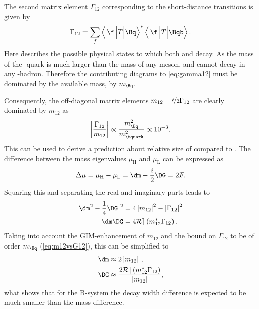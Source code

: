 The second matrix element $\Gamma_{12}$ corresponding to the short-distance transitions is given by
\begin{equation}
\Gamma_{12}=\sum_f\left<\,\f\,\Big|T\Big|\Bq\right>^\ast\left<\,\f\,\Big|T\Big|\Bqb\right>.\label{eq:gamma12}
\end{equation}
Here \f describes the possible physical states to which both \Bq and \Bqb decay.
As the mass of the \quark-quark is much larger than the mass of any \B meson, \Bq and \Bqb cannot decay in any \tquark-hadron.
Therefore the contributing diagrams to \cref{eq:gamma12} must be dominated by the available mass, \ie by $m_\Bq$.

Consequently, the off-diagonal matrix elements $m_{12}-\nicefrac{i}{2}\Gamma_{12}$ are clearly dominated by $m_{12}$ as
\begin{equation}
\left|\frac{\Gamma_{12}}{m_{12}}\right|\propto\frac{m_\Bq^2}{m_\tquark^2}\propto10^{-3}.\label{eq:m12vsG12}
\end{equation}
This can be used to derive a prediction about relative size of \DG compared to \dm.
The difference between the mass eigenvalues $\mu_\text{H}$ and $\mu_\text{L}$ can be expressed as
\begin{equation}
\Delta\mu=\mu_\text{H}-\mu_\text{L}=\dm-\frac{i}{2}\DG=2F.
\end{equation}
Squaring this and separating the real and imaginary parts leads to
\begin{equation}
\begin{aligned}
\dm^2-\frac{1}{4}\DG^{\kern 3.4pt2}&=4\left|m_{12}\right|^2-\left|\Gamma_{12}\right|^2\\
\dm\DG&=4\mathcal{Re}\left(m_{12}^\ast\Gamma_{12}\right).
\end{aligned}
\end{equation}
Taking into account the GIM-enhancement of $m_{12}$ and the bound on $\Gamma_{12}$ to be of order $m_\Bq$ (\cref{eq:m12vsG12}), this can be simplified to
\begin{equation}
\begin{aligned}
\dm&\approx2\left|m_{12}\right|\,,\\
\DG&\approx\frac{2\mathcal{Re}\left(m_{12}^\ast\Gamma_{12}\right)}{\left|m_{12}\right|},
\end{aligned}
\end{equation}
what shows that for the B-system the decay width difference is expected to be much smaller than the mass difference.

